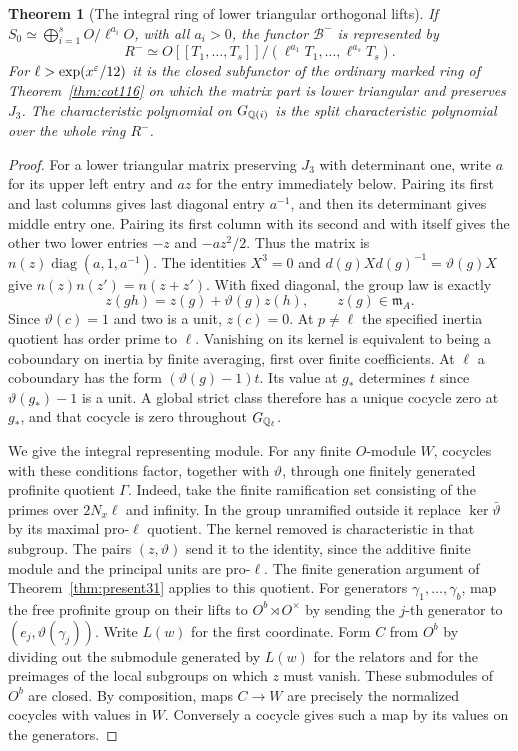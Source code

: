 \documentclass[a4paper,11pt]{article}
\newtheorem{theorem}[proposition]{Theorem}
\theoremstyle{definition}
\theoremstyle{remark}
\numberwithin{equation}{section}
\begin{document}
\begin{theorem}[The integral ring of lower triangular orthogonal lifts]
\label{thm:evenroot358}
If \(S_0\simeq\bigoplus_{i=1}^s O/\ell^{a_i}O\), with all
\(a_i>0\), the functor \(\mathcal B^-\) is represented by
\[
 R^- \simeq
 O[[T_1,\ldots,T_s]]/
       (\ell^{a_1}T_1,\ldots,\ell^{a_s}T_s).
\]
For \(\ell>\exp(x^\varepsilon/12)\) it is the closed subfunctor of the
ordinary marked ring of Theorem~\ref{thm:cot116} on which the
matrix part is lower triangular and preserves \(J_3\).
The characteristic polynomial on \(G_{\mathbb Q(i)}\) is the split
characteristic polynomial over the whole ring \(R^-\).
\end{theorem}
\begin{proof}
For a lower triangular matrix preserving \(J_3\) with determinant
one, write \(a\) for its upper left entry and \(az\) for the entry
immediately below. Pairing its first and last columns gives last
diagonal entry \(a^{-1}\), and then its determinant gives middle
entry one. Pairing its first column with its second and with itself
gives the other two lower entries \(-z\) and \(-az^2/2\).
Thus the matrix is \(n(z)\operatorname{diag}(a,1,a^{-1})\).
The identities \(X^3=0\) and \(d(g)Xd(g)^{-1}=\vartheta(g)X\)
give \(n(z)n(z')=n(z+z')\). With fixed diagonal, the group law is
exactly
\[
 z(gh)=z(g)+\vartheta(g)z(h),\qquad z(g)\in\mathfrak m_A .
\]
Since \(\vartheta(c)=1\) and two is a unit, \(z(c)=0\).
At \(p\ne\ell\) the specified inertia quotient has order prime to
\(\ell\). Vanishing on its kernel is equivalent to being a
coboundary on inertia by finite averaging, first over finite
coefficients. At \(\ell\) a coboundary has the form
\((\vartheta(g)-1)t\). Its value at \(g_*\) determines \(t\)
since \(\vartheta(g_*)-1\) is a unit. A global strict class therefore
has a unique cocycle zero at \(g_*\), and that cocycle is zero
throughout \(G_{\mathbb Q_\ell}\).

We give the integral representing module. For any finite
\(O\)-module \(W\), cocycles with these conditions factor,
together with \(\vartheta\), through one finitely generated
profinite quotient \(\Gamma\). Indeed, take the finite ramification
set consisting of the primes over \(2N_x\ell\) and infinity.
In the group unramified outside it replace \(\ker\bar\vartheta\)
by its maximal pro-\(\ell\) quotient. The kernel removed is
characteristic in that subgroup. The pairs \((z,\vartheta)\)
send it to the identity, since the additive finite module and the
principal units are pro-\(\ell\). The finite generation argument
of Theorem~\ref{thm:present31} applies to this quotient.
For generators \(\gamma_1,\ldots,\gamma_b\), map the free profinite
group on their lifts to \(O^b\rtimes O^\times\) by sending the
\(j\)-th generator to \((e_j,\vartheta(\gamma_j))\). Write \(L(w)\)
for the first coordinate. Form \(C\) from \(O^b\) by dividing out
the submodule generated by \(L(w)\) for the relators and for the
preimages of the local subgroups on which \(z\) must vanish.
These submodules of \(O^b\) are closed. By composition, maps
\(C\to W\) are precisely the normalized cocycles with values in \(W\).
Conversely a cocycle gives such a map by its values on the generators.


\end{proof}
\end{document}
